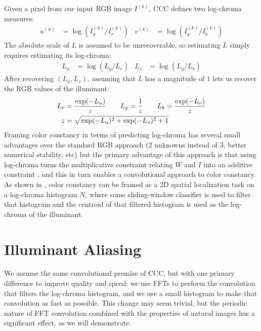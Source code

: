 \documentclass[10pt,twocolumn,letterpaper]{article}
\begin{document}
Given a pixel from our input RGB image $I^{(k)}$, CCC defines two log-chroma
measures:
\begin{align}
u^{(k)} &= \log \left( I^{(k)}_g / I^{(k)}_r \right) & v^{(k)} &= \log \left( I^{(k)}_g / I^{(k)}_b \right)
\end{align}
The absolute scale of $L$ is assumed to be unrecoverable,
so estimating $L$ simply requires estimating its log-chroma:
\begin{align}
L_u &= \log \left( L_g / L_r \right) & L_v &= \log \left( L_g / L_b \right)
\end{align}
After recovering $(L_u, L_v)$, assuming that $L$ has a magnitude of $1$ lets us
recover the RGB values of the illuminant:
\begin{align}
L_r &= {\exp(-L_u) \over z} \qquad L_g = {1 \over z} \qquad L_b = {\exp(-L_v) \over z} \nonumber \\
z &= \sqrt{\exp(-L_u)^2 + \exp(-L_v)^2 + 1}  \label{eq:light_rgb}
\end{align}
Framing color constancy in terms of predicting log-chroma has several small
advantages over the standard RGB approach ($2$ unknowns instead of $3$, better
numerical stability, etc) but the primary advantage of this approach is that using
log-chroma turns the multiplicative constraint relating $W$ and $I$ into
an additive constraint \cite{finlayson2001color}, and this in turn enables a
convolutional approach to color constancy.
As shown in \cite{BarronICCV2015}, color constancy can be framed as a 2D
spatial localization task on a log-chroma histogram $N$, where some
sliding-window classifier is used to filter that histogram and the centroid of
that filtered histogram is used as the log-chroma of the illuminant.

\section{Illuminant Aliasing}
\label{sec:aliasing}

We assume the same convolutional premise of CCC, but with one primary
difference to improve quality and speed: we use FFTs to perform the convolution
that filters the log-chroma histogram, and we use a small histogram
to make that convolution as fast as possible. This change may seem trivial,
but the periodic nature of FFT convolution combined with the properties of
natural images has a significant effect, as we will demonstrate.
\end{document}
